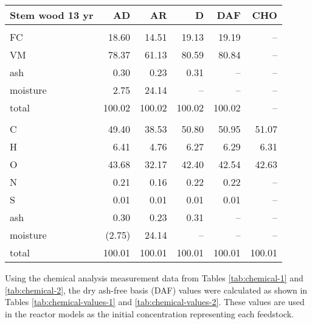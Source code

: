\begin{longtable}{lrrrrr}
    \textbf{Stem wood 13 yr} & AD & AR & D & DAF & CHO \\
    \hline \\
    FC       & 18.60  & 14.51  & 19.13  & 19.19  & -- \\
    VM       & 78.37  & 61.13  & 80.59  & 80.84  & -- \\
    ash      & 0.30   & 0.23   & 0.31   & --     & -- \\
    moisture & 2.75   & 24.14  & --     & --     & -- \\
    total    & 100.02 & 100.02 & 100.02 & 100.02 & -- \\
    \\
    C        & 49.40  & 38.53  & 50.80  & 50.95  & 51.07 \\
    H        & 6.41   & 4.76   & 6.27   & 6.29   & 6.31 \\
    O        & 43.68  & 32.17  & 42.40  & 42.54  & 42.63 \\
    N        & 0.21   & 0.16   & 0.22   & 0.22   & -- \\
    S        & 0.01   & 0.01   & 0.01   & 0.01   & -- \\
    ash      & 0.30   & 0.23   & 0.31   & --     & -- \\
    moisture & (2.75) & 24.14  & --     & --     & -- \\
    total    & 100.01 & 100.01 & 100.01 & 100.01 & 100.01 \\
\end{longtable}

Using the chemical analysis measurement data from Tables \ref{tab:chemical-1} and \ref{tab:chemical-2}, the dry ash-free basis (DAF) values were calculated as shown in Tables \ref{tab:chemical-values-1} and \ref{tab:chemical-values-2}. These values are used in the reactor models as the initial concentration representing each feedstock.

